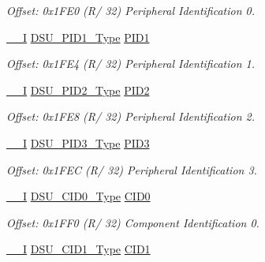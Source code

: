 \begin{DoxyCompactItemize}
\begin{DoxyCompactList}\small\item\em Offset\+: 0x1\+F\+E0 (R/ 32) Peripheral Identification 0. \end{DoxyCompactList}\item 
\mbox{\hyperlink{core__cm0plus_8h_af63697ed9952cc71e1225efe205f6cd3}{\+\_\+\+\_\+I}} \mbox{\hyperlink{union_d_s_u___p_i_d1___type}{D\+S\+U\+\_\+\+P\+I\+D1\+\_\+\+Type}} \mbox{\hyperlink{struct_dsu_afb83c5463380bc4b86a3ea40ad4aaab6}{P\+I\+D1}}
\begin{DoxyCompactList}\small\item\em Offset\+: 0x1\+F\+E4 (R/ 32) Peripheral Identification 1. \end{DoxyCompactList}\item 
\mbox{\hyperlink{core__cm0plus_8h_af63697ed9952cc71e1225efe205f6cd3}{\+\_\+\+\_\+I}} \mbox{\hyperlink{union_d_s_u___p_i_d2___type}{D\+S\+U\+\_\+\+P\+I\+D2\+\_\+\+Type}} \mbox{\hyperlink{struct_dsu_a0d3035ce892197d08526ac79b69cd927}{P\+I\+D2}}
\begin{DoxyCompactList}\small\item\em Offset\+: 0x1\+F\+E8 (R/ 32) Peripheral Identification 2. \end{DoxyCompactList}\item 
\mbox{\hyperlink{core__cm0plus_8h_af63697ed9952cc71e1225efe205f6cd3}{\+\_\+\+\_\+I}} \mbox{\hyperlink{union_d_s_u___p_i_d3___type}{D\+S\+U\+\_\+\+P\+I\+D3\+\_\+\+Type}} \mbox{\hyperlink{struct_dsu_af67380c0b807adcea9d24ae09d1d54b6}{P\+I\+D3}}
\begin{DoxyCompactList}\small\item\em Offset\+: 0x1\+F\+EC (R/ 32) Peripheral Identification 3. \end{DoxyCompactList}\item 
\mbox{\hyperlink{core__cm0plus_8h_af63697ed9952cc71e1225efe205f6cd3}{\+\_\+\+\_\+I}} \mbox{\hyperlink{union_d_s_u___c_i_d0___type}{D\+S\+U\+\_\+\+C\+I\+D0\+\_\+\+Type}} \mbox{\hyperlink{struct_dsu_a16e039fe0232f95c8dc7919b2542dd48}{C\+I\+D0}}
\begin{DoxyCompactList}\small\item\em Offset\+: 0x1\+F\+F0 (R/ 32) Component Identification 0. \end{DoxyCompactList}\item 
\mbox{\hyperlink{core__cm0plus_8h_af63697ed9952cc71e1225efe205f6cd3}{\+\_\+\+\_\+I}} \mbox{\hyperlink{union_d_s_u___c_i_d1___type}{D\+S\+U\+\_\+\+C\+I\+D1\+\_\+\+Type}} \mbox{\hyperlink{struct_dsu_a4f595fd177580b2c838f8844c314f245}{C\+I\+D1}}

\end{DoxyCompactItemize}
